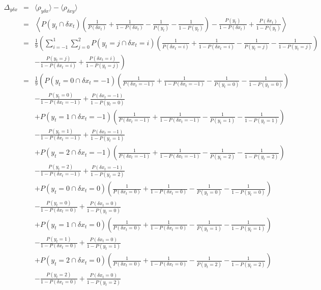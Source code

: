 \documentclass[a4paper,11pt]{article}
\begin{document}
\begin{eqnarray*}
\Delta_{y\delta x} &=& \langle \rho_{y\delta x}\rangle - \langle \rho_{\delta xy}\rangle\\
&=& \left\langle P(y_t\cap \delta x_t) \left( \frac{1}{P(\delta x_t)}+\frac{1}{1-P(\delta x_t)} - \frac{1}{P(y_t)}-\frac{1}{1-P(y_t)}\right) -\frac{P(y_t)}{1-P(\delta x_t)}+\frac{P(\delta x_t)}{1-P(y_t)}  \right\rangle\\
&=& \frac{1}{9}\left(\sum_{i=-1}^1 \sum_{j=0}^2 P(y_t=j\cap \delta x_t=i) \left( \frac{1}{P(\delta x_t=i)}+\frac{1}{1-P(\delta x_t=i)} - \frac{1}{P(y_t=j)}-\frac{1}{1-P(y_t=j)}\right)\right. \\
& &\left. -\frac{P(y_t=j)}{1-P(\delta x_t=i)}+\frac{P(\delta x_t=i)}{1-P(y_t=j)}\right)\\
&=& \frac{1}{9}\left(P(y_t=0\cap \delta x_t=-1) \left( \frac{1}{P(\delta x_t=-1)}+\frac{1}{1-P(\delta x_t=-1)} - \frac{1}{P(y_t=0)}-\frac{1}{1-P(y_t=0)}\right)\right.\\
& &-\frac{P(y_t=0)}{1-P(\delta x_t=-1)}+\frac{P(\delta x_t=-1)}{1-P(y_t=0)}\\
& &+ P(y_t=1\cap \delta x_t=-1) \left( \frac{1}{P(\delta x_t=-1)}+\frac{1}{1-P(\delta x_t=-1)} - \frac{1}{P(y_t=1)}-\frac{1}{1-P(y_t=1)}\right)\\
& &-\frac{P(y_t=1)}{1-P(\delta x_t=-1)}+\frac{P(\delta x_t=-1)}{1-P(y_t=1)}\\
& &+ P(y_t=2\cap \delta x_t=-1) \left( \frac{1}{P(\delta x_t=-1)}+\frac{1}{1-P(\delta x_t=-1)} - \frac{1}{P(y_t=2)}-\frac{1}{1-P(y_t=2)}\right)\\
& &-\frac{P(y_t=2)}{1-P(\delta x_t=-1)}+\frac{P(\delta x_t=-1)}{1-P(y_t=2)}\\
& &+P(y_t=0\cap \delta x_t=0) \left( \frac{1}{P(\delta x_t=0)}+\frac{1}{1-P(\delta x_t=0)} - \frac{1}{P(y_t=0)}-\frac{1}{1-P(y_t=0)}\right)\\
& &-\frac{P(y_t=0)}{1-P(\delta x_t=0)}+\frac{P(\delta x_t=0)}{1-P(y_t=0)}\\
& &+ P(y_t=1\cap \delta x_t=0) \left( \frac{1}{P(\delta x_t=0)}+\frac{1}{1-P(\delta x_t=0)} - \frac{1}{P(y_t=1)}-\frac{1}{1-P(y_t=1)}\right)\\
& &-\frac{P(y_t=1)}{1-P(\delta x_t=0)}+\frac{P(\delta x_t=0)}{1-P(y_t=1)}\\
& &+ P(y_t=2\cap \delta x_t=0) \left( \frac{1}{P(\delta x_t=0)}+\frac{1}{1-P(\delta x_t=0)} - \frac{1}{P(y_t=2)}-\frac{1}{1-P(y_t=2)}\right)\\
& &-\frac{P(y_t=2)}{1-P(\delta x_t=0)}+\frac{P(\delta x_t=0)}{1-P(y_t=2)}\\

\end{eqnarray*}
\end{document}
